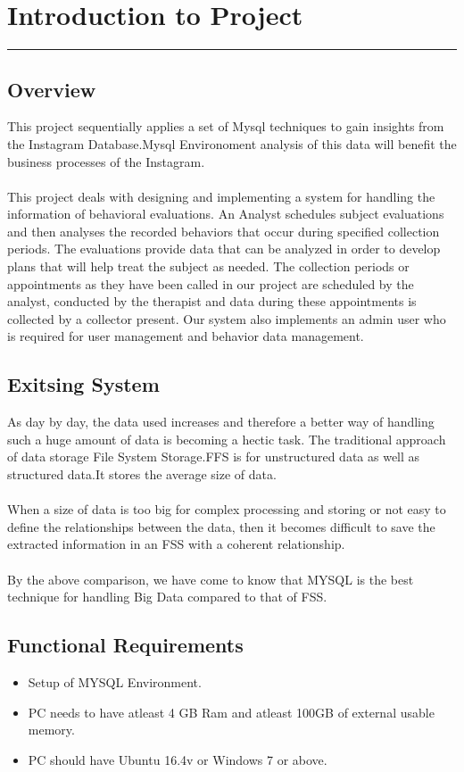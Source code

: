 \chapter{Introduction to Project}\hrule
\label{Chapter:1}
\section{Overview}

This project sequentially applies a set of Mysql techniques to gain insights from the Instagram Database.Mysql Environoment analysis of this data will benefit the business processes of the Instagram.
 \\
\\
This project deals with designing and implementing a system for handling the information of behavioral
evaluations. An Analyst schedules subject evaluations and then analyses the recorded behaviors that
occur during specified collection periods. The evaluations provide data that can be analyzed in order to
develop plans that will help treat the subject as needed.
The collection periods or appointments as they have been called in our project are scheduled by the
analyst, conducted by the therapist and data during these appointments is collected by a collector
present. Our system also implements an admin user who is required for user management and behavior
data management. 
 \section {Exitsing System}
 
 As day by day, the data used increases and therefore a better way of handling such a huge amount of data is becoming a hectic task. The traditional approach of data storage File System Storage.FFS is for unstructured data  as well as structured data.It stores the average size of data.
 \\
 \\
  When a size of data is too big for complex processing and storing or not easy to define the relationships between the data, then it becomes difficult to save the extracted information in an FSS with a coherent relationship.
  \\
  \\
  By the above comparison, we have come to know that MYSQL is the best technique for handling Big Data compared to that of FSS.
\section{Functional Requirements}
\begin{itemize}
	\item Setup of MYSQL Environment.
	\item PC needs to have atleast 4 GB Ram and atleast 100GB  of external usable memory.
	\item PC should have Ubuntu 16.4v or Windows 7 or above.
\end{itemize}
